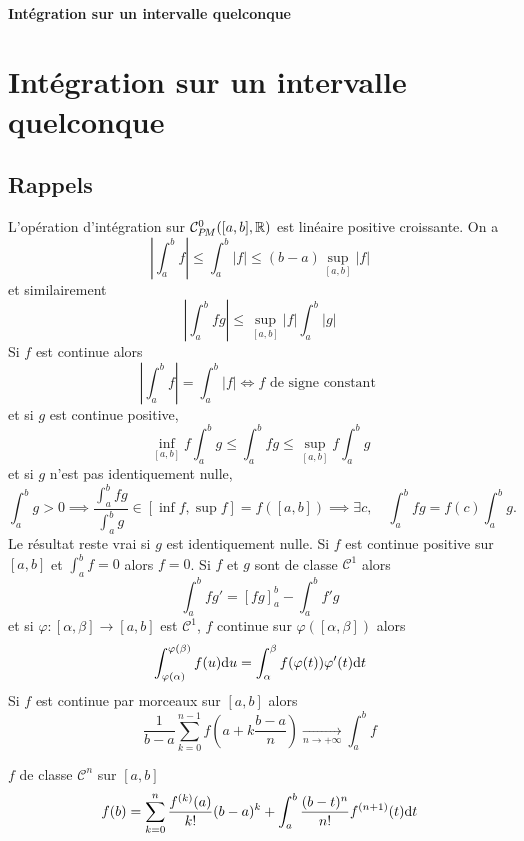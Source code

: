 \ifsolo
    ~

    \vspace{1cm}

    \begin{center}
        \textbf{\LARGE Intégration sur un intervalle quelconque} \\[1em]
    \end{center}
    \tableofcontents
\else
    \chapter{Intégration sur un intervalle quelconque}

    \minitoc
\fi
\thispagestyle{empty}

\ifsolo \newpage \setcounter{page}{1} \fi

\section{Rappels}

L'opération d'intégration sur $\CPM([a, b], \R)$ est linéaire positive croissante. On a \[
    \left| \int_a^bf \right|\leq \int_a^b|f|\leq (b-a)\sup_{[a,b]} |f|
\]
et similairement \[
    \left| \int_a^bfg \right|\leq \sup_{[a,b]}|f|\int_a^b|g|
\]
Si $f$ est continue alors \[
    \left| \int_a^bf \right|=\int_a^b|f|\iff f\text{ de signe constant }
\]
et si $g$ est continue positive, \[
    \inf_{[a,b]}f\int_a^bg\leq \int_a^bfg\leq \sup_{[a,b]}f\int_a^bg
\]
et si $g$ n'est pas identiquement nulle, \[
    \int_a^bg>0\implies \dfrac{\int_a^bfg}{\int_a^bg}\in[\inf f,\sup f]=f([a,b])\implies \exists c, \quad \int_a^bfg=f(c)\int_a^bg.
\]
Le résultat reste vrai si $g$ est identiquement nulle. Si $f$ est continue positive sur $[a, b]$ et $\int_a^bf=0$ alors $f=0$.
Si $f$ et $g$ sont de classe $\mathcal C^1$ alors \[
    \int_a^bfg'=[fg]_a^b-\int_a^bf'g
\]
et si $\varphi:[\alpha,\beta]\to[a,b]$ est $\mathcal C^1$, $f$ continue sur $\varphi([\alpha,\beta])$ alors \[
    \int_{\varphi(\alpha)}^{\varphi(\beta)}f(u)\mathrm{d} u=\int_\alpha^\beta f(\varphi(t))\varphi'(t)\mathrm{d} t
\]
Si $f$ est continue par morceaux sur $[a, b]$ alors \[
    \frac1{b-a}\sum_{k=0}^{n-1}f \left( a+k\frac{b-a}n \right)\xrightarrow[n\to+\infty]{}\int_a^bf
\]

\begin{thm}
    \Hyp $f$ de classe $\mathcal C^n$ sur $[a, b]$
    \Conc \[
        f(b)=\sum_{k=0}^n\frac{f^{(k)}(a)}{k!}(b-a)^k+\int_a^b\frac{(b-t)^n}{n!}f^{(n+1)}(t)\mathrm{d} t
    \]
\end{thm}

